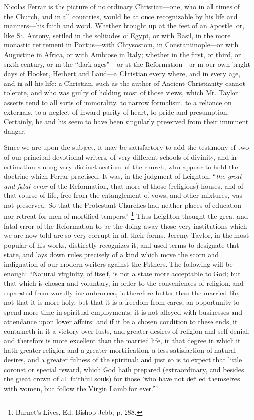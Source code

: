 Nicolas Ferrar is the picture of no ordinary
Christian—one, who in all times of the Church, and in all countries,
would be at once recognizable by his life and manners—his faith
and word. Whether brought up at the feet of an Apostle, or, like St.
Antony, settled in the solitudes of Egypt, or with Basil, in the more
monastic retirement in Pontus—with Chrysostom, in Constantinople—or
with Augustine in Africa, or with Ambrose in Italy; whether in the
first, or third, or sixth century, or in the ``dark ages''—or at the
Reformation—or in our own bright days of Hooker, Herbert and Laud—a
Christian every where, and in every age, and in all his life: a
Christian, such as the author of Ancient Christianity cannot tolerate,
and who was guilty of holding most of those views, which Mr. Taylor
asserts tend to all sorts of immorality, to narrow formalism, to a
reliance on externals, to a neglect of inward purity of heart, to pride
and presumption. Certainly, he and his seem to have been singularly
preserved from their imminent danger.

Since we are upon the subject, it may be
satisfactory to add the testimony of two of our principal devotional
writers, of very different schools of divinity, and in estimation among
very distinct sections of the church, who appear to hold the doctrine
which Ferrar practised. It was, in the judgment of Leighton, ``\emph{the
great and fatal error} of the Reformation, that more of those
(religious) houses, and of that course of life, free from the
entanglement of vows, and other mixtures, was not preserved. So that the
Protestant Churches had neither places of education nor retreat for men
of mortified tempers.'' \footnote{Burnet's Lives, Ed. Bishop Jebb, p. 288.} Thus
Leighton thought the great and fatal error of the Reformation to be the
doing away those very institutions which we are now told are so very
corrupt in all their forms. Jeremy Taylor, in the most popular of his
works, distinctly recognizes it, and used terms to designate that state,
and lays down rules precisely of a kind which move the scorn and
indignation of our modern writers against the Fathers. The following
will be enough: ``Natural virginity, of itself, is not a state more
acceptable to God; but that which is chosen and voluntary, in order to
the conveniences of religion, and separated from worldly incumbrances,
is therefore better than the married life,—not that it is more holy,
but that it is a freedom from cares, an opportunity to spend more time
in spiritual employments; it is not alloyed with businesses and
attendance upon lower affairs: and if it be a chosen condition to these
ends, it containeth in it a victory over lusts, and greater desires of
religion and self-denial, and therefore is more excellent than the
married life, in that degree in which it hath greater religion and a
greater mortification, a less satisfaction of natural desires, and a
greater fulness of the spiritual: and just so is to expect that
little coronet or special reward, which God hath prepared
(extraordinary, and besides the great crown of all faithful souls) for
those 'who have not defiled themselves with women, but follow the Virgin
Lamb for ever.'''

